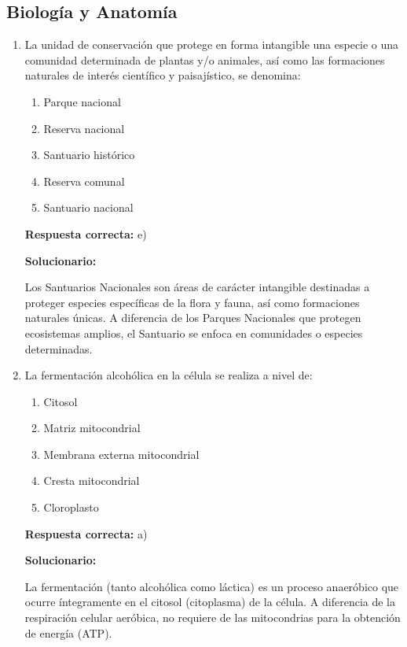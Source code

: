 \subsection*{Biología y Anatomía}

\begin{enumerate}[resume]

	\item La unidad de conservación que protege en forma intangible una especie o una comunidad determinada de plantas y/o animales, así como las formaciones naturales de interés científico y paisajístico, se denomina:
	
	\begin{enumerate}[label=\alph*)]
		\item Parque nacional
		\item Reserva nacional
		\item Santuario histórico
		\item Reserva comunal
		\item Santuario nacional
	\end{enumerate}
	
	\textbf{Respuesta correcta:} e)
	
	\vspace{2mm}
	\textbf{Solucionario:}
	
	Los Santuarios Nacionales son áreas de carácter intangible destinadas a proteger especies específicas de la flora y fauna, así como formaciones naturales únicas. A diferencia de los Parques Nacionales que protegen ecosistemas amplios, el Santuario se enfoca en comunidades o especies determinadas.
	
	\vspace{6mm}
	
	\item La fermentación alcohólica en la célula se realiza a nivel de:
	
	\begin{enumerate}[label=\alph*)]
		\item Citosol
		\item Matriz mitocondrial
		\item Membrana externa mitocondrial
		\item Cresta mitocondrial
		\item Cloroplasto
	\end{enumerate}
	
	\textbf{Respuesta correcta:} a)
	
	\vspace{2mm}
	\textbf{Solucionario:}
	
	La fermentación (tanto alcohólica como láctica) es un proceso anaeróbico que ocurre íntegramente en el citosol (citoplasma) de la célula. A diferencia de la respiración celular aeróbica, no requiere de las mitocondrias para la obtención de energía (ATP).
	
	\vspace{6mm}
\end{enumerate}




